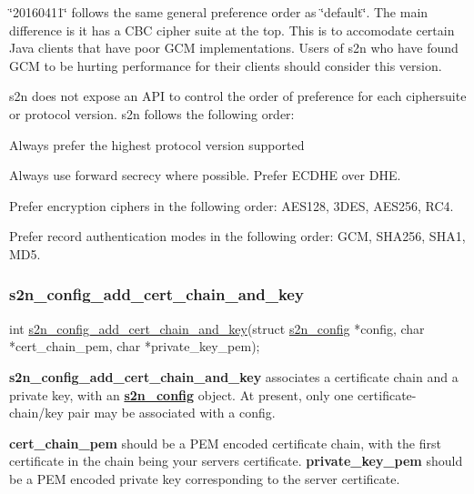 \char`\"{}20160411\char`\"{} follows the same general preference order as \char`\"{}default\char`\"{}. The main difference is it has a C\+BC cipher suite at the top. This is to accomodate certain Java clients that have poor G\+CM implementations. Users of s2n who have found G\+CM to be hurting performance for their clients should consider this version.

s2n does not expose an A\+PI to control the order of preference for each ciphersuite or protocol version. s2n follows the following order\+:


\begin{DoxyEnumerate}
\item Always prefer the highest protocol version supported
\item Always use forward secrecy where possible. Prefer E\+C\+D\+HE over D\+HE.
\item Prefer encryption ciphers in the following order\+: A\+E\+S128, 3\+D\+ES, A\+E\+S256, R\+C4.
\item Prefer record authentication modes in the following order\+: G\+CM, S\+H\+A256, S\+H\+A1, M\+D5.
\end{DoxyEnumerate}

\subsubsection*{s2n\+\_\+config\+\_\+add\+\_\+cert\+\_\+chain\+\_\+and\+\_\+key}


\begin{DoxyCode}
\textcolor{keywordtype}{int} \hyperlink{s2n_8h_a315153a7f97b2568970c19f7bf1d372e}{s2n\_config\_add\_cert\_chain\_and\_key}(\textcolor{keyword}{struct} 
      \hyperlink{structs2n__config}{s2n\_config} *config, 
                                      \textcolor{keywordtype}{char} *cert\_chain\_pem, 
                                      \textcolor{keywordtype}{char} *private\_key\_pem);
\end{DoxyCode}


{\bfseries s2n\+\_\+config\+\_\+add\+\_\+cert\+\_\+chain\+\_\+and\+\_\+key} associates a certificate chain and a private key, with an {\bfseries \hyperlink{structs2n__config}{s2n\+\_\+config}} object. At present, only one certificate-\/chain/key pair may be associated with a config.

{\bfseries cert\+\_\+chain\+\_\+pem} should be a P\+EM encoded certificate chain, with the first certificate in the chain being your servers certificate. {\bfseries private\+\_\+key\+\_\+pem} should be a P\+EM encoded private key corresponding to the server certificate.

